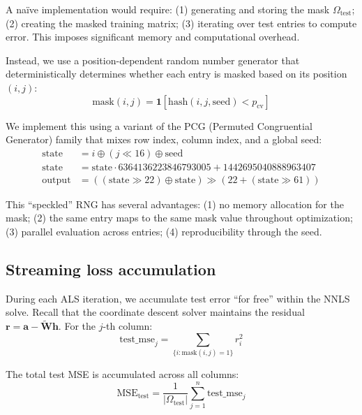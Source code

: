 \documentclass[article]{jss_modified}
\begin{document}
A na\"ive implementation would require: (1) generating and storing the mask 
$\Omega_{\text{test}}$; (2) creating the masked training matrix; (3) iterating 
over test entries to compute error. This imposes significant memory and 
computational overhead.

Instead, we use a position-dependent random number generator that deterministically 
determines whether each entry is masked based on its position $(i, j)$:
\begin{equation}
  \text{mask}(i, j) = \mathbf{1}[\text{hash}(i, j, \text{seed}) < p_{\text{cv}}]
  \label{eq:speckled}
\end{equation}

We implement this using a variant of the PCG (Permuted Congruential Generator) 
family \citep{ONeill2014} that mixes row index, column index, and a global seed:
\begin{align}
  \text{state} &= i \oplus (j \ll 16) \oplus \text{seed} \\
  \text{state} &= \text{state} \cdot 6364136223846793005 + 1442695040888963407 \\
  \text{output} &= ((\text{state} \gg 22) \oplus \text{state}) \gg 
  (22 + (\text{state} \gg 61))
  \label{eq:pcg}
\end{align}

This ``speckled'' RNG has several advantages: (1) no memory allocation for the 
mask; (2) the same entry maps to the same mask value throughout optimization; 
(3) parallel evaluation across entries; (4) reproducibility through the seed.

\subsection{Streaming loss accumulation}

During each ALS iteration, we accumulate test error ``for free'' within the 
NNLS solve. Recall that the coordinate descent solver maintains the residual 
$\mathbf{r} = \mathbf{a} - \tilde{\mathbf{W}}\mathbf{h}$. For the $j$-th column:
\begin{equation}
  \text{test\_mse}_j = \sum_{\{i : \text{mask}(i,j)=1\}} r_i^2
  \label{eq:streaming}
\end{equation}

The total test MSE is accumulated across all columns:
\begin{equation}
  \text{MSE}_{\text{test}} = \frac{1}{|\Omega_{\text{test}}|} 
  \sum_{j=1}^{n} \text{test\_mse}_j
  \label{eq:total_test}
\end{equation}
\end{document}
